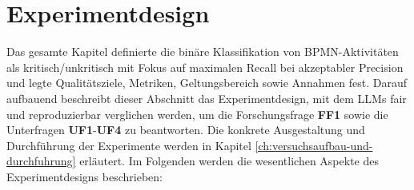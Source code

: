 \section{Experimentdesign}\label{sec:experimentdesign}

Das gesamte Kapitel definierte die binäre Klassifikation von \ac{BPMN}-Aktivitäten als kritisch/unkritisch mit Fokus auf maximalen Recall bei akzeptabler Precision und legte Qualitätsziele, Metriken, Geltungsbereich sowie Annahmen fest. Darauf aufbauend beschreibt dieser Abschnitt das Experimentdesign, mit dem \acp{LLM} fair und reproduzierbar verglichen werden, um die Forschungsfrage \textbf{FF1} sowie die Unterfragen \textbf{UF1}-\textbf{UF4} zu beantworten. Die konkrete Ausgestaltung und Durchführung der Experimente werden in Kapitel \ref{ch:versuchsaufbau-und-durchfuhrung} erläutert. Im Folgenden werden die wesentlichen Aspekte des Experimentdesigns beschrieben:

